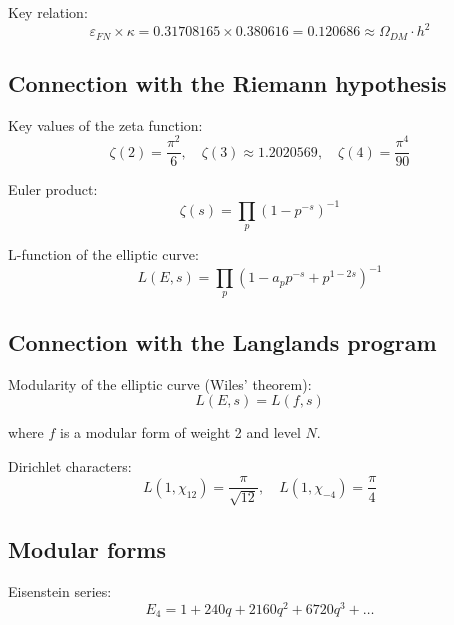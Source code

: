 \documentclass[12pt,a4paper,twoside]{article}
\newcommand{\EPS}{\varepsilon}
\theoremstyle{definition}
\begin{document}
Key relation:
\begin{equation}
\EPS_{FN} \times \kappa = 0.31708165 \times 0.380616 = 0.120686 \approx \Omega_{DM} \cdot h^2
\label{eq:dark_matter_relation}
\end{equation}

\subsection{Connection with the Riemann hypothesis}

Key values of the zeta function:
\begin{equation}
\zeta(2) = \frac{\pi^2}{6}, \quad \zeta(3) \approx 1.2020569, \quad \zeta(4) = \frac{\pi^4}{90}
\label{eq:zeta}
\end{equation}

Euler product:
\begin{equation}
\zeta(s) = \prod_{p} (1 - p^{-s})^{-1}
\label{eq:euler_product}
\end{equation}

L-function of the elliptic curve:
\begin{equation}
L(E, s) = \prod_{p} (1 - a_p p^{-s} + p^{1-2s})^{-1}
\label{eq:l_function}
\end{equation}

\subsection{Connection with the Langlands program}

Modularity of the elliptic curve (Wiles' theorem):
\begin{equation}
L(E, s) = L(f, s)
\label{eq:modularity}
\end{equation}

where $f$ is a modular form of weight 2 and level $N$.

Dirichlet characters:
\begin{equation}
L(1, \chi_{12}) = \frac{\pi}{\sqrt{12}}, \quad L(1, \chi_{-4}) = \frac{\pi}{4}
\label{eq:dirichlet}
\end{equation}

\subsection{Modular forms}

Eisenstein series:
\begin{equation}
E_4 = 1 + 240q + 2160q^2 + 6720q^3 + \ldots
\label{eq:eisenstein}
\end{equation}
\end{document}
